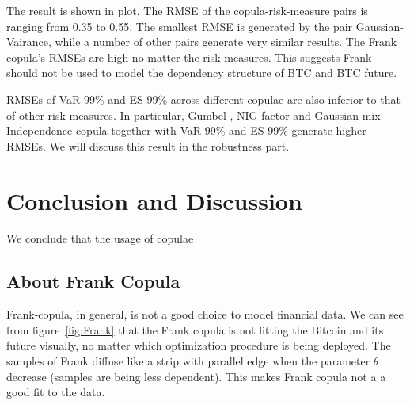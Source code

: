The result is shown in plot.
The RMSE of the copula-risk-measure pairs is ranging from 0.35 to 0.55.
The smallest RMSE is generated by the pair Gaussian-Vairance, while a number of other pairs generate very similar results.
The Frank copula's RMSEs are high no matter the risk measures.
This suggests Frank should not be used to model the dependency structure of BTC and BTC future.\medskip

RMSEs of VaR 99\% and ES 99\% across different copulae are also inferior to that of other risk measures.
In particular, Gumbel-, NIG factor-and Gaussian mix Independence-copula together with VaR 99\% and ES 99\%
generate higher RMSEs.
We will discuss this result in the robustness part.





\section{Conclusion and Discussion}
We conclude that the usage of copulae

\subsection{About Frank Copula}\label{subsec:Frank}
Frank-copula, in general, is not a good choice to model financial data.
We can see from figure~\ref{fig:Frank} that the Frank copula is not fitting the Bitcoin and its future visually, no matter
which optimization procedure is being deployed.
The samples of Frank diffuse like a strip with parallel edge when the parameter $\theta$ decrease (samples are being less dependent).
This makes Frank copula not a a good fit to the data.

